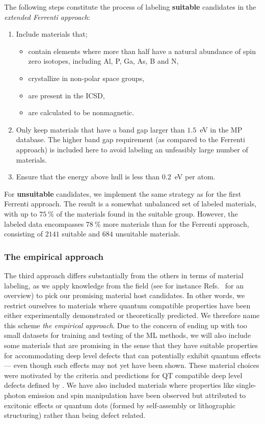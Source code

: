 \documentclass[superscriptaddress,unsortedaddress,
 amsmath,amssymb,
 aps,
]{revtex4-2}
\begin{document}
The following steps constitute the process of labeling \textbf{suitable} candidates in the \emph{extended Ferrenti approach}:
\begin{enumerate}
    \item Include materials that; 
    \begin{itemize}
        \item contain elements where more than half have a natural abundance of spin zero isotopes, including Al, P, Ga, As, B and N, 
        \item crystallize in non-polar space groups,
        \item are present in the ICSD,
        \item are calculated to be nonmagnetic. 
    \end{itemize}
    \item Only keep materials that have a band gap larger than $1.5$~eV in the MP database. The higher band gap requirement (as compared to the Ferrenti approach) is included here to avoid labeling an unfeasibly large number of materials. 
    \item Ensure that the energy above hull is less than $0.2$~eV per atom. 
\end{enumerate}

For \textbf{unsuitable} candidates, we implement the same strategy as for the first Ferrenti approach. The result is a somewhat unbalanced set of labeled materials, with up to $75 \ \%$ of the materials found in the suitable group. However, the labeled data encompasses $78 \ \%$ more materials than for the Ferrenti approach, consisting of $2141$ suitable and $684$ unsuitable materials.

\subsubsection*{The empirical approach}
The third approach differs substantially from the others in terms of material labeling, as we apply knowledge from the field (see for instance Refs.~\cite{Atatuere2018,Toth2019,Zhang2020,Son2020} for an overview) to pick our promising material host candidates.  
In other words, we restrict ourselves to materials where quantum compatible properties have been either experimentally demonstrated or theoretically predicted. 
We therefore name this scheme \emph{the empirical approach}. Due to the concern of ending up with too small datasets for training and testing of the ML methods, we will also include some  materials that are promising in the sense that they have suitable properties for accommodating deep level defects that can potentially exhibit quantum effects --- even though such effects may not yet have been shown. These material choices were motivated by the criteria and predictions for QT compatible deep level defects defined by \citeauthor{Weber2010} \cite{Weber2010}. 
We have also included materials where properties like single-photon emission and spin manipulation have been observed but attributed to excitonic effects or quantum dots (formed by self-assembly or lithographic structuring) rather than being defect related.
\end{document}
